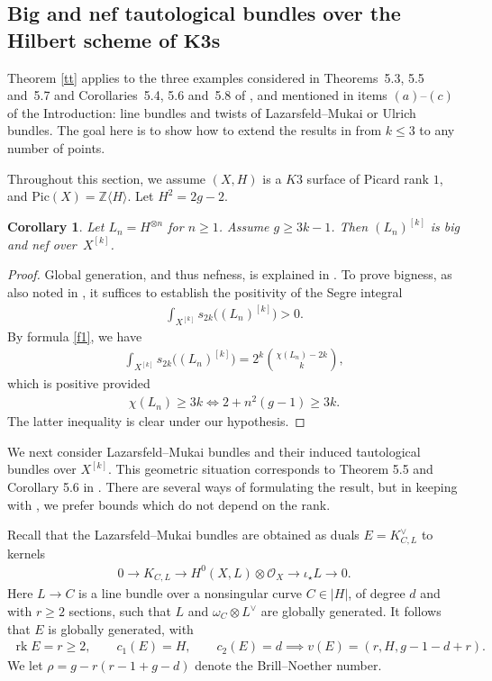 \documentclass[10pt,a4paper]{amsart}
\numberwithin{equation}{section}
\newtheorem{Corollary}[Theorem]{Corollary}
\newcommand{\rk}{\operatorname{rk}}
\begin{document}
\subsection[Big and nef tautological bundles over the Hilbert scheme of K3s]
{Big and nef tautological bundles over the Hilbert scheme of $\boldsymbol{K3}$s} \label{secex}

Theorem \ref{tt} applies to the three examples considered in Theorems~5.3, 5.5 and~5.7 and Corollaries~5.4, 5.6 and~5.8 of \cite{BBF}, and mentioned in items $(a)$--$(c)$ of the Introduction: line bundles and twists of Lazarsfeld--Mukai or Ulrich bundles. The goal here is to show how to extend the results in \cite{BBF} from $k\leq 3$ to any number of points.

Throughout this section, we assume $(X, H)$ is a $K3$ surface of Picard rank $1$, and $\text{Pic}(X)=\mathbb Z\langle H\rangle$. Let $H^2=2g-2$.

\begin{Corollary} \label{c4}Let $L_n=H^{\otimes n}$ for $n\geq 1$. Assume $g\geq 3k-1$. Then $(L_n)^{[k]}$ is big and nef over~$X^{[k]}$.
\end{Corollary}

\begin{proof}
Global generation, and thus nefness, is explained in \cite[Theorem 5.3]{BBF}. To prove bigness, as also noted in \cite{BBF}, it suffices to establish the positivity of the Segre integral
\begin{gather*}
\int_{X^{[k]}} s_{2k} \big((L_n)^{[k]}\big)>0.
\end{gather*}
By formula \eqref{f1}, we have
\begin{gather*}
\int_{X^{[k]}} s_{2k} \big((L_n)^{[k]}\big)=2^k \binom{\chi(L_n)-2k}{k},
\end{gather*}
which is positive provided
\begin{gather*}
\chi(L_n)\geq 3k\iff 2+n^2(g-1)\geq 3k.
\end{gather*}
The latter inequality is clear under our hypothesis.
\end{proof}


We next consider Lazarsfeld--Mukai bundles and their induced tautological bundles over $X^{[k]}$. This geometric situation corresponds to Theorem 5.5 and Corollary 5.6 in \cite{BBF}. There are several ways of formulating the result, but in keeping with \cite{BBF}, we prefer bounds which do not depend on the rank.

Recall that the Lazarsfeld--Mukai bundles are obtained as duals $E=K_{C, L}^{\vee}$ to kernels
\begin{gather*}
0\to K_{C, L}\to H^0(X, L)\otimes \mathcal O_X\to \iota_{\star} L\to 0.
\end{gather*}
Here $L\to C$ is a line bundle over a nonsingular curve $C\in |H|$, of degree $d$ and with $r\geq 2$ sections, such that $L$ and $\omega_C\otimes L^{\vee}$ are globally generated. It follows that $E$ is globally generated, with
\begin{gather*}
\rk E=r\geq 2, \qquad c_1(E)=H, \qquad c_2(E)=d\implies v(E)=(r, H, g-1-d+r).
\end{gather*}
We let $\rho=g-r(r-1+g-d)$ denote the Brill--Noether number.
\end{document}
